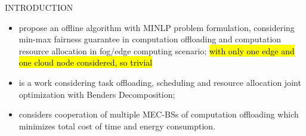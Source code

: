 \documentclass[10pt, conference, letterpaper]{IEEEtran}
\begin{document}
\begin{section}{INTRODUCTION}
\begin{itemize}
\begin{itemize}
                    \item \cite{Du2018} propose an offline algorithm with MINLP problem formulation, considering min-max fairness guarantee in computation offloading and computation resource allocation in fog/edge computing scenario; \hl{with only one edge and one cloud node considered, so trivial}
                    \item \cite{Alameddine2019} is a work considering task offloading, scheduling and resource allocation joint optimization with Benders Decomposition;
                    \item \cite{Fan2017} considers cooperation of multiple MEC-BSs of computation offloading which minimizes total cost of time and energy consumption.
                \end{itemize}

\end{itemize}
\end{section}
\end{document}
